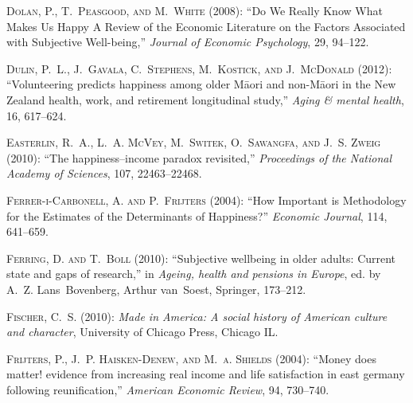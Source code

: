 \documentclass[10pt, letterpaper]{article}
\begin{document}
\begin{spacing}{1.4}
\begin{thebibliography}{87}
\textsc{Dolan, P., T.~Peasgood, and M.~White} (2008): \enquote{Do We Really
  Know What Makes Us Happy A Review of the Economic Literature on the Factors
  Associated with Subjective Well-being,} \emph{Journal of Economic
  Psychology}, 29, 94--122.

\textsc{Dulin, P.~L., J.~Gavala, C.~Stephens, M.~Kostick, and J.~McDonald}
  (2012): \enquote{Volunteering predicts happiness among older M{\=a}ori and
  non-M{\=a}ori in the New Zealand health, work, and retirement longitudinal
  study,} \emph{Aging \& mental health}, 16, 617--624.

\textsc{Easterlin, R.~A., L.~A. McVey, M.~Switek, O.~Sawangfa, and J.~S. Zweig}
  (2010): \enquote{The happiness--income paradox revisited,} \emph{Proceedings
  of the National Academy of Sciences}, 107, 22463--22468.

\textsc{{Ferrer-i-Carbonell}, A. and P.~Frijters} (2004): \enquote{How
  Important is Methodology for the Estimates of the Determinants of Happiness?}
  \emph{Economic Journal}, 114, 641--659.

\textsc{Ferring, D. and T.~Boll} (2010): \enquote{Subjective wellbeing in older
  adults: Current state and gaps of research,} in \emph{Ageing, health and
  pensions in Europe}, ed. by A.~Z. Lans~Bovenberg, Arthur van~Soest, Springer,
  173--212.

\textsc{Fischer, C.~S.} (2010): \emph{Made in America: A social history of
  American culture and character}, University of Chicago Press, Chicago IL.

\textsc{Frijters, P., J.~P. Haisken-Denew, and M.~a. Shields} (2004):
  \enquote{{Money does matter! evidence from increasing real income and life
  satisfaction in east germany following reunification},} \emph{American
  Economic Review}, 94, 730--740.


\end{thebibliography}
\end{spacing}
\end{document}

